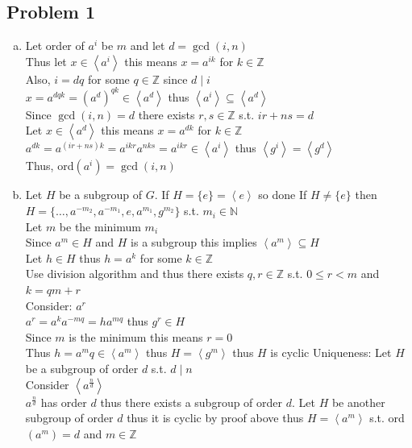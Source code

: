 \documentclass[12pt,letterpaper]{article}
\theoremstyle{definition}
\newcommand{\Z}{\mathbb{Z}}
\newcommand{\N}{\mathbb{N}}
\newcommand{\ang}[1]{\left\langle #1 \right\rangle}
\begin{document}
\pagestyle{fancy}
\fancyhf{}
\fancyhead[ROE]{\thepage}

\newpage
\subsection*{Problem 1}
\begin{enumerate}[(a)]
    \item Let order of $a^i$ be $m$ and let $d=\gcd(i,n)$\\
    Thus let $x \in \ang{a^i}$ this means $x=a^{ik}$ for $k \in \Z$\\
    Also, $i=dq$ for some $q \in \Z$ since $d \mid i$\\
    $x=a^{dqk}=(a^d)^{qk} \in \ang{a^d}$ thus $\ang{a^i} \subseteq \ang{a^d}$\\
    Since $\gcd(i,n)=d$ there exists $r,s \in \Z$ s.t. $ir+ns=d$\\
    Let $x \in \ang{a^d}$ this means $x=a^{dk}$ for $k \in \Z$\\
    $a^{dk}=a^{(ir+ns)k}=a^{ikr}a^{nks}=a^{ikr} \in \ang{a^i}$ thus $\ang{g^i}=\ang{g^d}$\\
    Thus, ord$(a^i)=\gcd(i,n)$
    \item Let $H$ be a subgroup of $G$.
    If $H=\{e\}=\ang{e}$ so done
    If $H\neq \{e\}$ then $H=\{\dots,a^{-m_2},a^{-m_1},e,a^{m_1},g^{m_2}\}$ s.t. $m_i \in \N$\\
    Let $m$ be the minimum $m_i$\\
    Since $a^m \in H$ and $H$ is a subgroup this implies $\ang{a^m} \subseteq H$\\
    Let $h \in H$ thus $h=a^k$ for some $k \in \Z$\\
    Use division algorithm and thus there exists $q,r \in \Z$ s.t. $0 \leq r < m$ and $k=qm+r$\\
    Consider: $a^r$\\
    $a^r=a^ka^{-mq}=ha^{mq}$ thus $g^r \in H$\\
    Since $m$ is the minimum this means $r=0$\\
    Thus $h=a^mq \in \ang{a^m}$ thus $H=\ang{g^m}$ thus $H$ is cyclic
    Uniqueness: Let $H$ be a subgroup of order $d$ s.t. $d \mid n$\\
    Consider $\ang{a^{\frac{n}{d}}}$\\
    $a^{\frac{n}{d}}$ has order $d$ thus there exists a subgroup of order $d$.
    Let $H$ be another subgroup of order $d$ thus it is cyclic by proof above thus $H=\ang{a^m}$ s.t. ord$(a^m)=d$ and $m \in \Z$\\

\end{enumerate}
\end{document}
